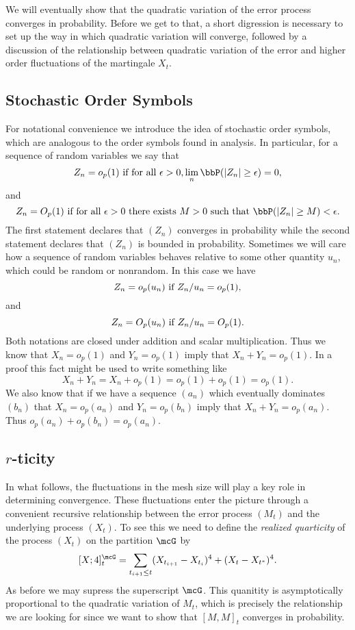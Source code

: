 \documentclass{report}
\begin{document}
We will eventually show that the quadratic variation of the error
process converges in probability.  Before we get to that, a short
digression is necessary to set up the way in which quadratic variation
will converge, followed by a discussion of the relationship between
quadratic variation of the error and higher order fluctuations of the
martingale $X_t$.


\subsection{Stochastic Order Symbols}

For notational convenience we introduce the idea of stochastic order
symbols, which are analogous to the order symbols found in analysis. 
In particular, for a sequence of random variables we say that
\[
Z_n = o_p(1) \textmd{ if for all } \epsilon > 0, \lim_n \bbP(|Z_n|
\geq \epsilon) = 0,
\]
and
\[
Z_n = O_p(1) \textmd{ if for all } \epsilon > 0 \textmd{ there exists
} M > 0 \textmd{ such that } \bbP(|Z_n| \geq M) < \epsilon.
\]
The first statement declares that $(Z_n)$ converges in probability
while the second statement declares that $(Z_n)$ is bounded in
probability.  Sometimes we will care how a sequence of random
variables behaves relative to some other quantity $u_n$, which could
be random or nonrandom.  In this case we have
\[
Z_n = o_p(u_n) \textmd{ if } Z_n / u_n = o_p(1),
\]
and
\[
Z_n = O_p(u_n) \textmd{ if } Z_n / u_n = O_p(1).
\]
Both notations are closed under addition and scalar multiplication. 
Thus we know that $X_n = o_p(1)$ and $Y_n = o_p(1)$ imply that $X_n +
Y_n = o_p(1)$.  In a proof this fact might be used to write something
like 
\[
X_n + Y_n = X_n + o_p(1) = o_p(1) + o_p(1) = o_p(1).
\]
We also know that if we have a sequence $(a_n)$ which eventually
dominates $(b_n)$ that $X_n = o_p(a_n)$ and $Y_n = o_p(b_n)$ imply
that $X_n + Y_n = o_p(a_n)$.  Thus $o_p(a_n) + o_p(b_n) = o_p(a_n)$. 

\subsection{$r$-ticity}

In what follows, the fluctuations in the mesh size will play a key
role in determining convergence.  These fluctuations enter the picture
through a convenient recursive relationship between the error process
$(M_t)$ and the underlying process $(X_t)$.  To see this we need to
define the \emph{realized quarticity} of the process $(X_t)$ on the
partition $\mcG$ by
\[
[X;4]_t^\mcG = \sum_{t_{i+1} \leq t} (X_{t_{i+1}} - X_{t_i})^4 + (X_t
- X_{t^*})^4.
\]
As before we may supress the superscript $\mcG$.  This quanitity is
asymptotically proportional to the quadratic variation of $M_t$, which
is precisely the relationship we are looking for since we want to show
that $[M,M]_t$ converges in probability.
\end{document}
